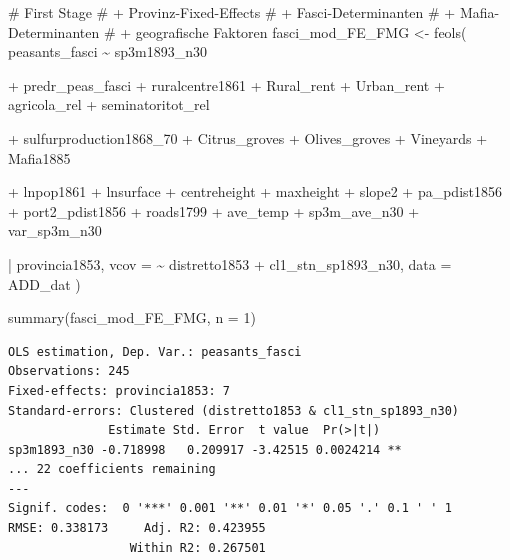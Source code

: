 \documentclass[
  a4paper,
  DIV=11,
  oneside]{scrreprt}
\newenvironment{Shaded}{\begin{snugshade}}{\end{snugshade}}
\newcommand{\AttributeTok}[1]{\textcolor[rgb]{0.40,0.45,0.13}{#1}}
\newcommand{\CommentTok}[1]{\textcolor[rgb]{0.37,0.37,0.37}{#1}}
\newcommand{\DecValTok}[1]{\textcolor[rgb]{0.68,0.00,0.00}{#1}}
\newcommand{\FunctionTok}[1]{\textcolor[rgb]{0.28,0.35,0.67}{#1}}
\newcommand{\NormalTok}[1]{\textcolor[rgb]{0.00,0.23,0.31}{#1}}
\newcommand{\OtherTok}[1]{\textcolor[rgb]{0.00,0.23,0.31}{#1}}
\newcommand{\SpecialCharTok}[1]{\textcolor[rgb]{0.37,0.37,0.37}{#1}}
\begin{document}
\begin{Shaded}
\begin{Highlighting}[]
\CommentTok{\# First Stage}
\CommentTok{\# + Provinz{-}Fixed{-}Effects}
\CommentTok{\# + Fasci{-}Determinanten}
\CommentTok{\# + Mafia{-}Determinanten}
\CommentTok{\# + geografische Faktoren}
\NormalTok{fasci\_mod\_FE\_FMG }\OtherTok{\textless{}{-}} \FunctionTok{feols}\NormalTok{(}
\NormalTok{  peasants\_fasci }\SpecialCharTok{\textasciitilde{}}\NormalTok{ sp3m1893\_n30 }
  
  \SpecialCharTok{+}\NormalTok{ predr\_peas\_fasci}
  \SpecialCharTok{+}\NormalTok{ ruralcentre1861}
  \SpecialCharTok{+}\NormalTok{ Rural\_rent}
  \SpecialCharTok{+}\NormalTok{ Urban\_rent}
  \SpecialCharTok{+}\NormalTok{ agricola\_rel}
  \SpecialCharTok{+}\NormalTok{ seminatoritot\_rel}
  
  \SpecialCharTok{+}\NormalTok{ sulfurproduction1868\_70}
  \SpecialCharTok{+}\NormalTok{ Citrus\_groves}
  \SpecialCharTok{+}\NormalTok{ Olives\_groves}
  \SpecialCharTok{+}\NormalTok{ Vineyards}
  \SpecialCharTok{+}\NormalTok{ Mafia1885}
  
  \SpecialCharTok{+}\NormalTok{ lnpop1861}
  \SpecialCharTok{+}\NormalTok{ lnsurface}
  \SpecialCharTok{+}\NormalTok{ centreheight}
  \SpecialCharTok{+}\NormalTok{ maxheight}
  \SpecialCharTok{+}\NormalTok{ slope2}
  \SpecialCharTok{+}\NormalTok{ pa\_pdist1856}
  \SpecialCharTok{+}\NormalTok{ port2\_pdist1856}
  \SpecialCharTok{+}\NormalTok{ roads1799}
  \SpecialCharTok{+}\NormalTok{ ave\_temp}
  \SpecialCharTok{+}\NormalTok{ sp3m\_ave\_n30}
  \SpecialCharTok{+}\NormalTok{ var\_sp3m\_n30}
  
  \SpecialCharTok{|}\NormalTok{ provincia1853,  }
  \AttributeTok{vcov =} \SpecialCharTok{\textasciitilde{}}\NormalTok{ distretto1853 }\SpecialCharTok{+}\NormalTok{ cl1\_stn\_sp1893\_n30,}
  \AttributeTok{data =}\NormalTok{ ADD\_dat }
\NormalTok{) }

\FunctionTok{summary}\NormalTok{(fasci\_mod\_FE\_FMG, }\AttributeTok{n =} \DecValTok{1}\NormalTok{)}
\end{Highlighting}
\end{Shaded}

\begin{verbatim}
OLS estimation, Dep. Var.: peasants_fasci
Observations: 245
Fixed-effects: provincia1853: 7
Standard-errors: Clustered (distretto1853 & cl1_stn_sp1893_n30) 
              Estimate Std. Error  t value  Pr(>|t|)    
sp3m1893_n30 -0.718998   0.209917 -3.42515 0.0024214 ** 
... 22 coefficients remaining
---
Signif. codes:  0 '***' 0.001 '**' 0.01 '*' 0.05 '.' 0.1 ' ' 1
RMSE: 0.338173     Adj. R2: 0.423955
                 Within R2: 0.267501
\end{verbatim}
\end{document}
